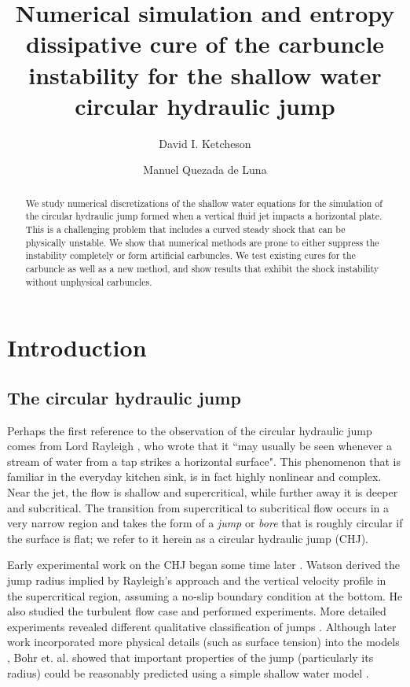 \documentclass[preprint, 11pt]{article}
\title{Numerical simulation and entropy dissipative cure of the
  carbuncle instability for the shallow water circular hydraulic jump}
\author{
    David I. Ketcheson \and
    Manuel Quezada de Luna
}
\begin{document}
\maketitle

\begin{abstract}
We study numerical discretizations of the shallow water equations
for the simulation of the circular hydraulic jump formed
when a vertical fluid jet impacts a horizontal plate.
This is a challenging problem that includes a curved steady shock
that can be physically unstable.  We show that numerical methods are prone to
either suppress the instability completely or form artificial carbuncles.
We test existing cures for the carbuncle as well as a new method,
and show results that exhibit the shock instability without unphysical carbuncles.
\end{abstract}



\section{Introduction}

\subsection{The circular hydraulic jump}

Perhaps the first reference to the observation of the circular hydraulic jump
comes from Lord Rayleigh \cite{rayleigh1914theory}, who wrote that it
``may usually be seen whenever a stream of water from a tap strikes a horizontal
surface".  This phenomenon that is familiar in the everyday kitchen sink, is in
fact highly nonlinear and complex.  Near the jet, the flow is shallow and
supercritical, while further away it is deeper and subcritical.  The transition from supercritical
to subcritical flow
occurs in a very narrow region and takes the form of a \emph{jump} or \emph{bore}
that is roughly circular if the surface is flat; we refer to it herein as a
circular hydraulic jump (CHJ).

Early experimental work on the CHJ began some time later
\cite{kurihara1946hydraulic,tani1949water,watson1964radial}.
Watson \cite{watson1964radial} derived the jump radius
implied by Rayleigh's approach and the vertical
velocity profile in the supercritical region, assuming a no-slip
boundary condition at the bottom.  He also studied the turbulent
flow case and performed experiments.
More detailed experiments revealed different qualitative classification
of jumps  \cite{ishigai1977heat,craik1981circular}.
Although later work incorporated more physical details (such as surface tension) into the models
\cite{bush2003influence}, Bohr et. al. showed that important properties of the jump
(particularly its radius) could be reasonably predicted using a simple shallow water
model \cite{bohr1993shallow}.
\end{document}
